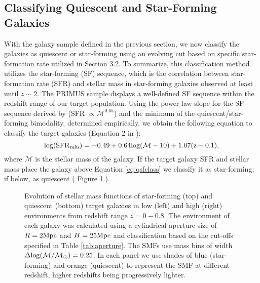 \documentclass{emulateapj}
\begin{document}
\subsection{Classifying Quiescent and Star-Forming Galaxies} \label{sec:sfq}
With the galaxy sample defined in the previous section, we now classify the galaxies as quiescent or star-forming using an evolving cut based on specific star-formation rate utilized in \cite{Moustakas:2013aa} Section 3.2.
To summarize, this classification method utilizes the star-forming (SF) sequence, which is the correlation between star-formation rate (SFR) and stellar mass in star-forming 
galaxies observed at least until $z \sim 2$.
The PRIMUS sample displays a well-defined SF sequence within the redshift range of our target population.
Using the power-law slope for the SF sequence derived by \cite{Salim:2007aa} (SFR $\propto \mathcal{M}^{0.65}$) and the minimum of the quiescent/star-forming bimodality, 
determined empirically, we obtain the following equation to classify the target galaxies (Equation 2 in \cite{Moustakas:2013aa}):
\begin{equation}
\label{eq:qsfclass} 
\rm{log}(\rm{SFR}_{\rm{min}}) = -0.49 + 0.64 \rm{log}(\mathcal{M} - 10) +1.07(z-0.1), 
\end{equation}
where $\mathcal{M}$ is the stellar mass of the galaxy.
If the target galaxy SFR and stellar mass place the galaxy above Equation \ref{eq:qsfclass} we classify it as star-forming; if below, as quiescent (\cite{Moustakas:2013aa} Figure 1.).

\begin{figure*}
  \begin{center}
    \leavevmode
     \label{fig:smf}
     \caption{Evolution of stellar mass functions of star-forming (top) and quiescent (bottom) target galaxies in 
low (left) and high (right) environments from redshift range $z=0-0.8$. The environment of each galaxy  
was calculated using a cylindrical aperture size of $R=2\rm{Mpc}$ and $H=25\rm{Mpc}$ and  
classification based on the cut-offs specified in Table \ref{tab:aperture}. The SMFs use mass bins of 
width $\Delta \rm{log}(\mathcal{M}/\mathcal{M}_{\odot})=0.25$. In each panel we use shades of blue 
(star-forming) and orange (quiescent) to represent the SMF at different redshift, higher redshifts being
progressively lighter.}
    \end{center}
\end{figure*}
\end{document}
